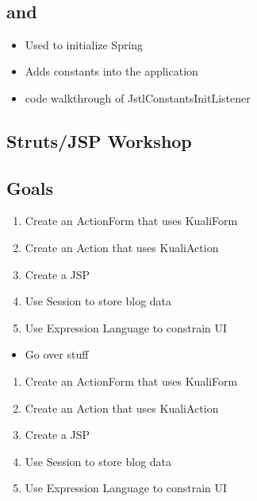 \begin{ifhtml}
  \begin{s5slide}
      \section{ \\
        and }
    \begin{itemize}
      \item Used to initialize Spring
      \item Adds constants into the application
    \end{itemize}
  \end{s5slide}

  \begin{s5notes}
    \begin{itemize}
      \item code walkthrough of JstlConstantsInitListener
    \end{itemize}
  \end{s5notes}

  \begin{s5slide}
    \section{Struts/JSP Workshop}
    \subsection{Goals}
    \begin{enumerate}
      \item Create an ActionForm that uses KualiForm
      \item Create an Action that uses KualiAction
      \item Create a JSP
      \item Use Session to store blog data
      \item Use Expression Language to constrain UI
    \end{enumerate}
  \end{s5slide}

  \begin{s5notes}
    \begin{itemize}
      \item Go over stuff
    \end{itemize}
    \begin{enumerate}
      \item Create an ActionForm that uses KualiForm
      \item Create an Action that uses KualiAction
      \item Create a JSP
      \item Use Session to store blog data
      \item Use Expression Language to constrain UI
    \end{enumerate}
  \end{s5notes}

\end{ifhtml}